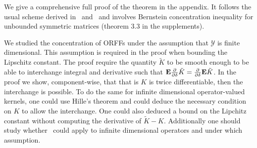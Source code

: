 We give a comprehensive full proof of the theorem in the appendix. It follows the usual scheme derived in~\citet{Rahimi2007} and~\citet{sutherland2015} and involves Bernstein concentration inequality for unbounded symmetric matrices (theorem 3.3 in the supplements).
\begin{remark}\label{remark:infinite_dimension}
We studied the concentration of ORFFs under the assumption that $\mathcal{Y}$ is finite dimensional. This assumption is required in the proof when bounding the Lipschitz constant. The proof require the quantity $\tilde{K}$ to be smooth enough to be able to interchange integral and derivative such that ${\mathbf{{E}}}\frac{\partial}{\partial \delta}\tilde{K}=\frac{\partial}{\partial \delta}{\mathbf{{E}}}\tilde{K}$. In the proof we show, component-wise, that that is $K$ is twice differentiable, then the interchange is possible. To do the same for infinite dimensional operator-valued kernels, one could use Hille's theorem and could deduce the necessary condition on $K$ to allow the interchange. One could also deduced a bound on the Lipchitz constant without computing the derivative of $\tilde{K}-K$. Additionally one should study whether~\citet[theorem 4]{koltchinskii2013remark} could apply to infinite dimensional operators and under which assumption.
\end{remark}
